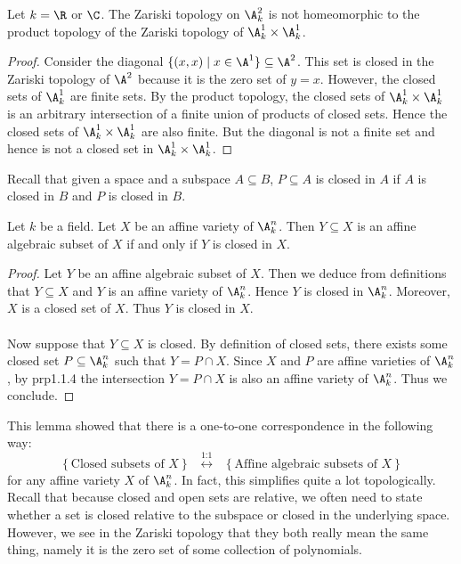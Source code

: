 \documentclass[a4paper]{article}
\begin{document}
\begin{eg}{}{} Let $k=\R$ or $\C$. The Zariski topology on $\A_k^2$ is not homeomorphic to the product topology of the Zariski topology of $\A_k^1\times\A_k^1$. \tcbline
\begin{proof}
Consider the diagonal $\{(x,x)\;|\;x\in\A^1\}\subseteq\A^2$. This set is closed in the Zariski topology of $\A^2$ because it is the zero set of $y=x$. However, the closed sets of $\A_k^1$ are finite sets. By the product topology, the closed sets of $\A_k^1\times\A_k^1$ is an arbitrary intersection of a finite union of products of closed sets. Hence the closed sets of $\A_k^1\times\A_k^1$ are also finite. But the diagonal is not a finite set and hence is not a closed set in $\A_k^1\times\A_k^1$. 
\end{proof}
\end{eg}

Recall that given a space and a subspace $A\subseteq B$, $P\subseteq A$ is closed in $A$ if $A$ is closed in $B$ and $P$ is closed in $B$. 

\begin{lmm}{}{} Let $k$ be a field. Let $X$ be an affine variety of $\A_k^n$. Then $Y\subseteq X$ is an affine algebraic subset of $X$ if and only if $Y$ is closed in $X$. \tcbline
\begin{proof}
Let $Y$ be an affine algebraic subset of $X$. Then we deduce from definitions that $Y\subseteq X$ and $Y$ is an affine variety of $\A_k^n$. Hence $Y$ is closed in $\A_k^n$. Moreover, $X$ is a closed set of $X$. Thus $Y$ is closed in $X$. \\~\\

Now suppose that $Y\subseteq X$ is closed. By definition of closed sets, there exists some closed set $P\subseteq\A_k^n$ such that $Y=P\cap X$. Since $X$ and $P$ are affine varieties of $\A_k^n$, by prp1.1.4 the intersection $Y=P\cap X$ is also an affine variety of $\A_k^n$. Thus we conclude. 
\end{proof}
\end{lmm}

This lemma showed that there is a one-to-one correspondence in the following way: $$\left\{\text{Closed subsets of }X\right\}\;\;\overset{\text{1:1}}{\longleftrightarrow}\;\;\left\{\text{Affine algebraic subsets of }X\right\}$$ for any affine variety $X$ of $\A_k^n$. In fact, this simplifies quite a lot topologically. Recall that because closed and open sets are relative, we often need to state whether a set is closed relative to the subspace or closed in the underlying space. However, we see in the Zariski topology that they both really mean the same thing, namely it is the zero set of some collection of polynomials. 
\end{document}
